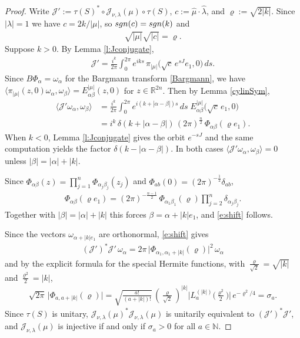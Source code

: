 \documentclass[11pt]{amsart}
\theoremstyle{plain}
\theoremstyle{definition}
\theoremstyle{remark}
\numberwithin{equation}{section}
\def\cJ{\mathcal{J}}
\def\R{{\mathbb R}}%
\def\N{{\mathbb N}}%
\numberwithin{equation}{section}
\begin{document}
\begin{proof}
Write $\cJ':=\tau(S)^*\circ\cJ_{\nu, \lambda}(\mu)\circ\tau(S)$, $c:=\hat{\mu}\cdot\hat{\lambda}$, and $\varrho:=\sqrt{2|k|}$. Since $|\lambda|=1$ we have $c=2k/|\mu|$, so ${\rm sgn}(c)={\rm sgn}(k)$ and
\begin{align*}
	\sqrt{|\mu|}\sqrt{|c|}=\varrho.
\end{align*}
Suppose $k>0$. By Lemma \ref{l:Jconjugate},
\begin{align*}
	\cJ'=\frac{i^k}{2\pi}\int_0^{2\pi}e^{iks}\,\pi_{|\mu|}\big(\sqrt{c}\, e^{sJ}e_1, 0\big)\, ds.
\end{align*}
Since $B\Phi_\alpha=\omega_\alpha$ for the Bargmann transform \eqref{Bargmann}, we have $\langle \pi_{|\mu|}(z, 0)\omega_\alpha, \omega_\beta\rangle=E^{|\mu|}_{\alpha\beta}(z, 0)$ for $z\in \R^{2n}$. Then by Lemma \ref{cylinSym},
\begin{align*}
	\langle \cJ'\omega_\alpha, \omega_\beta\rangle
	&=\frac{i^k}{2\pi}\int_0^{2\pi}e^{i(k+|\alpha-\beta|)s}\, ds\; E^{|\mu|}_{\alpha\beta}\big(\sqrt{c}\, e_1, 0\big)\\
	&=i^k\,\delta(k+|\alpha-\beta|)\,(2\pi)^{\frac{n}{2}}\,\Phi_{\alpha\beta}(\varrho e_1).
\end{align*}
When $k<0$, Lemma \ref{l:Jconjugate} gives the orbit $e^{-sJ}$ and the same computation yields the factor $\delta(k-|\alpha-\beta|)$. In both cases $\langle \cJ'\omega_\alpha, \omega_\beta\rangle=0$ unless $|\beta|=|\alpha|+|k|$.

Since $\Phi_{\alpha\beta}(z)=\prod_{j=1}^n\Phi_{\alpha_j\beta_j}(z_j)$ and $\Phi_{ab}(0)=(2\pi)^{-\frac{1}{2}}\delta_{ab}$,
\begin{align*}
	\Phi_{\alpha\beta}(\varrho e_1)=(2\pi)^{-\frac{n-1}{2}}\,\Phi_{\alpha_1\beta_1}(\varrho)\prod_{j=2}^n\delta_{\alpha_j\beta_j}.
\end{align*}
Together with $|\beta|=|\alpha|+|k|$ this forces $\beta=\alpha+|k|e_1$, and \eqref{e:shift} follows.

Since the vectors $\omega_{\alpha+|k|e_1}$ are orthonormal, \eqref{e:shift} gives
\begin{align*}
	(\cJ')^*\cJ'\,\omega_\alpha=2\pi\,\big|\Phi_{\alpha_1, \alpha_1+|k|}(\varrho)\big|^2\,\omega_\alpha
\end{align*}
and by the explicit formula for the special Hermite functions, with $\tfrac{\varrho}{\sqrt{2}}=\sqrt{|k|}$ and $\tfrac{\varrho^2}{2}=|k|$,
\begin{align*}
	\sqrt{2\pi}\,\big|\Phi_{a, a+|k|}(\varrho)\big|=\sqrt{\tfrac{a!}{(a+|k|)!}}\,\left(\tfrac{\varrho}{\sqrt{2}}\right)^{|k|}\big|L_a^{(|k|)}\big(\tfrac{\varrho^2}{2}\big)\big|\, e^{-\varrho^2/4}=\sigma_a.
\end{align*}
Since $\tau(S)$ is unitary, $\cJ_{\nu, \lambda}(\mu)^*\cJ_{\nu, \lambda}(\mu)$ is unitarily equivalent to $(\cJ')^*\cJ'$, and $\cJ_{\nu, \lambda}(\mu)$ is injective if and only if $\sigma_a>0$ for all $a\in \N$.
\end{proof}
\end{document}
